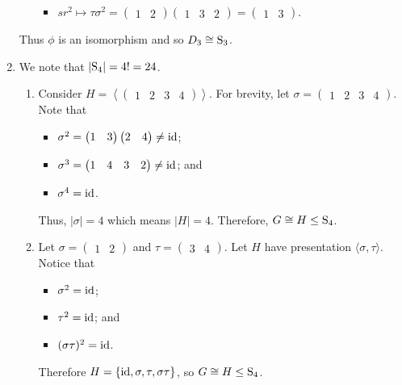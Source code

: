 \begin{enumerate}
\begin{itemize}
\begin{itemize}
            \item $sr^2 \mapsto \tau\sigma^2 = \begin{pmatrix}1 & 2\end{pmatrix}\begin{pmatrix}1 & 3 & 2\end{pmatrix} = \begin{pmatrix}1 & 3\end{pmatrix}$.
        \end{itemize}
    \end{itemize}
    Thus $\phi$ is an isomorphism and so $D_3 \cong \mathrm{S}_{3}$.

    \item We note that $|\mathrm{S}_{4}| = 4! = 24$.
    \begin{enumerate}[label=(\alph*)]
        \item Consider $H = \left\langle \begin{pmatrix}1 & 2 & 3 & 4\end{pmatrix} \right\rangle$. For brevity, let $\sigma = \begin{pmatrix}1 & 2 & 3 & 4\end{pmatrix}$. Note that
        \begin{itemize}
            \item $\sigma^2 = \begin{pmatrix}1 & 3\end{pmatrix}\begin{pmatrix}2 & 4\end{pmatrix} \neq \mathrm{id}$;
            \item $\sigma^3 = \begin{pmatrix}1 & 4 & 3 & 2\end{pmatrix} \neq \mathrm{id}$; and
            \item $\sigma^4 = \mathrm{id}$.
        \end{itemize}
        Thus, $|\sigma| = 4$ which means $|H| = 4$. Therefore, $G \cong H \leq \mathrm{S}_{4}$.

        \item Let $\sigma = \begin{pmatrix}1 & 2\end{pmatrix}$ and $\tau = \begin{pmatrix}3 & 4\end{pmatrix}$. Let $H$ have presentation $\langle \sigma, \tau \rangle$. Notice that
        \begin{itemize}
            \item $\sigma^2 = \mathrm{id}$;
            \item $\tau^2 = \mathrm{id}$; and
            \item $(\sigma\tau)^2 = \mathrm{id}$.
        \end{itemize}
        Therefore $H = \{\mathrm{id}, \sigma, \tau, \sigma\tau\}$, so $G \cong H \leq \mathrm{S}_{4}$.
    \end{enumerate}
\end{enumerate}


